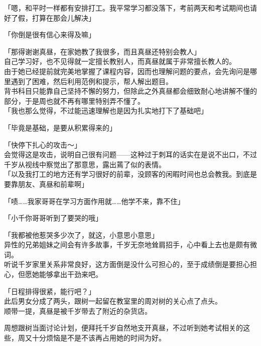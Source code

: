 「嗯，和平时一样都有安排打工。我平常学习都没落下，考前两天和考试期间也请好了假，打算在那会儿解决」

「你倒是很有信心来得及嘛」

「那得谢谢真昼，在家她教了我很多，而且真昼还特别会教人」\\

自己学习好，也不见得就一定擅长教别人，而真昼就属于非常擅长教人的。\\

由于她已经提前就完美地掌握了课程内容，因而也理解问题的要点，会先询问是哪里遇到了困难，然后利用范例和提示，帮人解出题目。\\

背书科目只能靠自己坚持不懈的努力，但除此之外真昼都会细致耐心地讲解不懂的部分，于是周也就不再有哪里特别弄不懂了。\\

「我也那么觉得，不过能迅速理解也是因为扎实地打下了基础吧」

「毕竟是基础，是要从积累得来的」

「快停下扎心的攻击～」\\

会觉得这是攻击，说明自己很有问题——这种过于刺耳的话实在是说不出口，不过千岁从视线中察觉出了那意思，露出蔫了似的表情。\\

「以及我打工的地方还有学习很好的前辈，没顾客的闲暇时间也总会教我。到底是要靠朋友、真昼和前辈啊」

「啧……我家哥哥在学习方面作用就……他学不来，靠不住」

「小千你哥哥听到了要哭的哦」

「我都被他惹哭多少次了，就这，小意思小意思」\\

异性的兄弟姐妹之间会有许多故事，千岁无奈地耸肩招手，心中看上去也是颇有微词。\\

听说千岁家里关系非常良好，这方面倒是没什么可担心的，至于成绩倒是要担心担心，但愿她能够拿出干劲来吧。

\vspace{2\baselineskip}

「日程排得很紧，能行吧？」\\

此后男女分成了两头，跟树一起留在教室里的周对树的关心点了点头。\\

顺带一提，真昼是被千岁带去了附近的杂货店。

周想跟树当面讨论计划，便拜托千岁自然地支开真昼，不过听到她考试相关的这些，周又十分烦恼是不是不该再占用她的时间为好。\\

